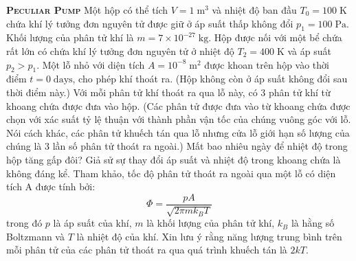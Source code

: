 \begin{problem}{\textbf{\textsc{Peculiar Pump}}} Một hộp có thể tích $V=1\;\mathrm{m}^3$ và nhiệt độ ban đầu $T_0=100\;\mathrm{K}$ chứa khí lý tưởng đơn nguyên tử được giữ ở áp suất thấp không đổi $p_1=100\;\mathrm{Pa}$. Khối lượng của phân tử khí là $m=7\times10^{-27}\;\mathrm{kg}$. Hộp được nối với một bể chứa rất lớn có chứa khí lý tưởng đơn nguyên tử ở nhiệt độ $T_2=400\;\mathrm{K}$ và áp suất $p_2>p_1$. Một lỗ nhỏ với diện tích $A=10^{-8}\;\mathrm{m}^2$ được khoan trên hộp vào thời điểm $t=0\;\mathrm{days}$, cho phép khí thoát ra. (Hộp không còn ở áp suất không đổi sau thời điểm này.) Với mỗi phân tử khí thoát ra qua lỗ này, có 3 phân tử khí từ khoang chứa được đưa vào hộp. (Các phân tử được đưa vào từ khoang chứa được chọn với xác suất tỷ lệ thuận với thành phần vận tốc của chúng vuông góc với lỗ. Nói cách khác, các phân tử khuếch tán qua lỗ nhưng cửa lỗ giới hạn số lượng của chúng là 3 lần số phân tử thoát ra ngoài.) Mất bao nhiêu ngày để nhiệt độ trong hộp tăng gấp đôi? Giả sử sự thay đổi áp suất và nhiệt độ trong khoang chứa là không đáng kể. Tham khảo, tốc độ phân tử thoát ra ngoài qua một lỗ có diện tích A được tính bởi:\begin{equation*}
    \Phi=\frac{pA}{\sqrt{2\pi mk_BT}}
\end{equation*}
trong đó $p$ là áp suất của khí, $m$ là khối lượng của phân tử khí, $k_B$ là hằng số Boltzmann và $T$ là nhiệt độ của khí. Xin lưu ý rằng năng lượng trung bình trên mỗi phân tử của các phân tử thoát ra qua quá trình khuếch tán là $2kT$.

\end{problem}